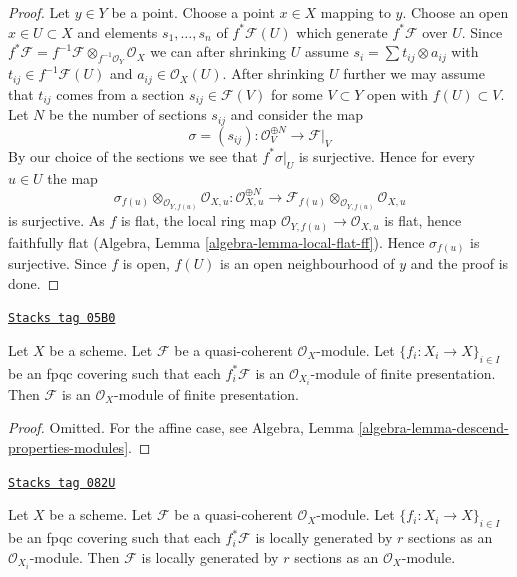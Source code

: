 \begin{proof}
Let $y \in Y$ be a point. Choose a point $x \in X$ mapping to $y$.
Choose an open $x \in U \subset X$ and elements $s_1, \ldots, s_n$
of $f^*\mathcal{F}(U)$ which generate $f^*\mathcal{F}$ over $U$.
Since $f^*\mathcal{F} =
f^{-1}\mathcal{F} \otimes_{f^{-1}\mathcal{O}_Y} \mathcal{O}_X$
we can after shrinking $U$ assume $s_i = \sum t_{ij} \otimes a_{ij}$
with $t_{ij} \in f^{-1}\mathcal{F}(U)$ and $a_{ij} \in \mathcal{O}_X(U)$.
After shrinking $U$ further we may assume that $t_{ij}$ comes from
a section $s_{ij} \in \mathcal{F}(V)$ for some $V \subset Y$ open
with $f(U) \subset V$. Let $N$ be the number of sections $s_{ij}$ and
consider the map
$$
\sigma = (s_{ij}) : \mathcal{O}_V^{\oplus N} \to \mathcal{F}|_V
$$
By our choice of the sections we see that $f^*\sigma|_U$ is surjective.
Hence for every $u \in U$ the map
$$
\sigma_{f(u)} \otimes_{\mathcal{O}_{Y, f(u)}} \mathcal{O}_{X, u} :
\mathcal{O}_{X, u}^{\oplus N}
\longrightarrow
\mathcal{F}_{f(u)} \otimes_{\mathcal{O}_{Y, f(u)}} \mathcal{O}_{X, u}
$$
is surjective. As $f$ is flat, the local ring map
$\mathcal{O}_{Y, f(u)} \to \mathcal{O}_{X, u}$ is flat, hence
faithfully flat (Algebra, Lemma \ref{algebra-lemma-local-flat-ff}).
Hence $\sigma_{f(u)}$ is surjective. Since $f$ is open, $f(U)$ is
an open neighbourhood of $y$ and the proof is done.
\end{proof}

\begin{lemma}
\label{descent-lemma-finite-presentation-descends}
\href{https://stacks.math.columbia.edu/tag/05B0}{\texttt{Stacks tag 05B0}}

Let $X$ be a scheme.
Let $\mathcal{F}$ be a quasi-coherent $\mathcal{O}_X$-module.
Let $\{f_i : X_i \to X\}_{i \in I}$ be an fpqc covering such that
each $f_i^*\mathcal{F}$ is an $\mathcal{O}_{X_i}$-module of finite
presentation. Then $\mathcal{F}$ is an $\mathcal{O}_X$-module
of finite presentation.
\end{lemma}

\begin{proof}
Omitted. For the affine case, see
Algebra, Lemma \ref{algebra-lemma-descend-properties-modules}.
\end{proof}

\begin{lemma}
\label{descent-lemma-locally-generated-by-r-sections-descends}
\href{https://stacks.math.columbia.edu/tag/082U}{\texttt{Stacks tag 082U}}

Let $X$ be a scheme.
Let $\mathcal{F}$ be a quasi-coherent $\mathcal{O}_X$-module.
Let $\{f_i : X_i \to X\}_{i \in I}$ be an fpqc covering such that
each $f_i^*\mathcal{F}$ is locally generated by $r$ sections as an
$\mathcal{O}_{X_i}$-module. Then $\mathcal{F}$ is locally generated by
$r$ sections as an $\mathcal{O}_X$-module.
\end{lemma}

